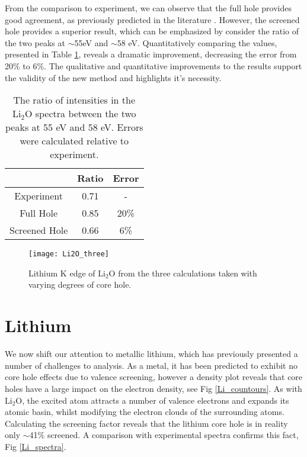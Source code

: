 From the comparison to experiment, we can observe that the full hole provides good agreement, as previously predicted in the literature \cite{mauchamp_ab_2006}. However, the screened hole provides a superior result, which can be emphasized by consider the ratio of the two peaks at $\sim$55eV and $\sim$58 eV.  Quantitatively comparing the values, presented in Table \ref{ratio}, reveals a dramatic improvement, decreasing the error from 20\% to  6\%.  The qualitative and quantitative improvements to the results support the validity of the new method and highlights it's necessity.  

\begin{table}
	\centering
	\begin{tabular}{ccc}
		& Ratio & Error \\
		\hline
		Experiment & 0.71 & -  \\
		Full Hole & 0.85 & 20\%  \\
		Screened Hole & 0.66 & 6\%  \\
		
	\end{tabular}
	\caption{The ratio of intensities in the $\mathrm{Li_2O}$ spectra between the two peaks at 55 eV and 58 eV.  Errors were calculated relative to experiment.   }
	\label{ratio}
\end{table}




\begin{figure}
	\centering
	\texttt{[image: Li2O\_three]}
	\caption{Lithium K edge of $ \mathrm{Li_2O} $ from the three calculations taken with varying degrees of core hole. }
	\label{Li2O_three}
\end{figure}

\section{Lithium}
We now shift our attention to metallic lithium, which has previously presented a  number of challenges to analysis.  As a metal, it has been predicted to exhibit no core hole effects due to valence screening, however a density plot reveals that core  holes have a large impact on the electron density, see Fig \ref{Li_countours}. As with $ \mathrm{Li_2O} $, the excited atom attracts a number of valence electrons and expands its atomic basin, whilst modifying the electron clouds of the surrounding atoms.  Calculating the screening factor reveals that the lithium core hole is in reality only $ \sim$41\% screened.  A comparison with experimental spectra confirms this fact, Fig \ref{Li_spectra}.


